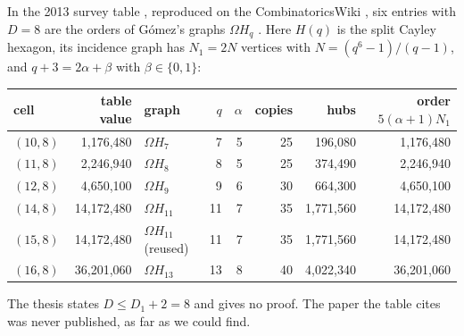 \documentclass[11pt]{amsart}
\theoremstyle{plain}
\theoremstyle{definition}
\theoremstyle{remark}
\newcommand{\Om}{\Omega}
\begin{document}
In the 2013 survey table \cite[Table 4]{MS13}, reproduced on the CombinatoricsWiki \cite{CW}, six entries with $D = 8$
are the orders of Gómez's graphs $\Om H_q$ \cite[\S2.9.3, values on p.~46]{Go86}. Here $H(q)$ is the split Cayley
hexagon, its incidence graph has $N_1 = 2N$ vertices with $N = (q^6-1)/(q-1)$, and $q + 3 = 2\alpha + \beta$ with
$\beta \in \{0,1\}$:
\begin{center}\small
\begin{tabular}{@{}lrlrrrrr@{}}
\toprule
cell & table value & graph & $q$ & $\alpha$ & copies & hubs & order $5(\alpha+1)N_1$\\
\midrule
$(10,8)$ & 1,176,480 & $\Om H_7$ & 7 & 5 & 25 & 196,080 & 1,176,480\\
$(11,8)$ & 2,246,940 & $\Om H_8$ & 8 & 5 & 25 & 374,490 & 2,246,940\\
$(12,8)$ & 4,650,100 & $\Om H_9$ & 9 & 6 & 30 & 664,300 & 4,650,100\\
$(14,8)$ & 14,172,480 & $\Om H_{11}$ & 11 & 7 & 35 & 1,771,560 & 14,172,480\\
$(15,8)$ & 14,172,480 & $\Om H_{11}$ (reused) & 11 & 7 & 35 & 1,771,560 & 14,172,480\\
$(16,8)$ & 36,201,060 & $\Om H_{13}$ & 13 & 8 & 40 & 4,022,340 & 36,201,060\\
\bottomrule
\end{tabular}
\end{center}
The thesis states $D \le D_1 + 2 = 8$ and gives no proof. The paper the table cites \cite{DGQ} was never published, as
far as we could find.
\end{document}
